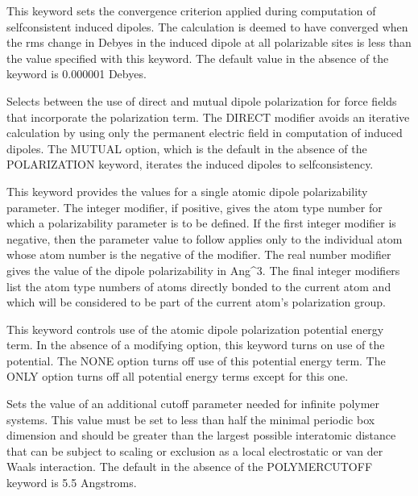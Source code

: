 \documentclass[letterpaper,11pt,english]{sphinxmanual}
\begin{document}
  This keyword sets the convergence criterion applied during computation of self\sphinxhyphen{}consistent induced dipoles. The calculation is deemed to have converged when the rms change in Debyes in the induced dipole at all polarizable sites is less than the value specified with this keyword. The default value in the absence of the keyword is 0.000001 Debyes.


  Selects between the use of direct and mutual dipole polarization for force fields that incorporate the polarization term. The DIRECT modifier avoids an iterative calculation by using only the permanent electric field in computation of induced dipoles. The MUTUAL option, which is the default in the absence of the POLARIZATION keyword, iterates the induced dipoles to self\sphinxhyphen{}consistency.




  This keyword provides the values for a single atomic dipole polarizability parameter. The integer modifier, if positive, gives the atom type number for which a polarizability parameter is to be defined. If the first integer modifier is negative, then the parameter value to follow applies only to the individual atom whose atom number is the negative of the modifier. The real number modifier gives the value of the dipole polarizability in Ang\textasciicircum{}3. The final integer modifiers list the atom type numbers of atoms directly bonded to the current atom and which will be considered to be part of the current atom’s polarization group.

  This keyword controls use of the atomic dipole polarization potential energy term. In the absence of a modifying option, this keyword turns on use of the potential. The NONE option turns off use of this potential energy term. The ONLY option turns off all potential energy terms except for this one.

  Sets the value of an additional cutoff parameter needed for infinite polymer systems. This value must be set to less than half the minimal periodic box dimension and should be greater than the largest possible interatomic distance that can be subject to scaling or exclusion as a local electrostatic or van der Waals interaction. The default in the absence of the POLYMER\sphinxhyphen{}CUTOFF keyword is 5.5 Angstroms.
\end{document}
